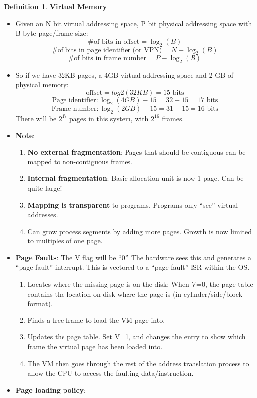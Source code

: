 \documentclass[11pt,a4paper]{article}
\theoremstyle{definition}
\newtheorem{definition}{Definition}[section]
\newenvironment{myitemize}
{ \begin{itemize}
    \setlength{\itemsep}{5pt}
    \setlength{\parskip}{0pt}
    \setlength{\parsep}{0pt}     }
{ \end{itemize}                  }
\newenvironment{myenumerate}
{ \begin{enumerate}
    \setlength{\itemsep}{5pt}
    \setlength{\parskip}{0pt}
    \setlength{\parsep}{0pt}     }
{ \end{enumerate}                }
\begin{document}
\begin{definition}{\textbf{Virtual Memory}}
\begin{myitemize}
	\item Given an N bit virtual addressing space, P bit physical addressing space with B byte page/frame size:
	\[\text{\# of bits in offset} = \log_2(B) \]
	\[\text{\# of bits in page identifier (or VPN)} = N - \log_2(B) \]
	\[\text{\# of bits in frame number} = P - \log_2(B) \]
	\item So if we have 32KB pages, a 4GB virtual addressing space and  2 GB of physical memory:
	\[\text{offset} =log2(32KB) = 15 \text{ bits}\]
	\[\text{Page identifier}: \log_2(4GB)-15=32-15=17 \text{ bits} \]
	\[\text{Frame number}: \log_2(2GB)-15=31-15=16 \text{ bits} \]
	There will be $2^{17}$ pages in this system, with $2^{16}$ frames.
	\item \textbf{Note}: 
	\begin{myenumerate}
		\item \textbf{No external fragmentation}: Pages that should be contiguous can be mapped to non-contiguous frames.
		\item \textbf{Internal fragmentation}: Basic allocation unit is now 1 page. Can be quite large!
		\item \textbf{Mapping is transparent} to programs. Programs only ``see'' virtual addresses.
		\item Can grow process segments by adding more pages. Growth is now limited to multiples of one page.
	\end{myenumerate}
	\item \textbf{Page Faults}: The V flag will be ``0''. The hardware sees this and generates a ``page fault'' interrupt. This is vectored to a “page fault” ISR within the OS.
	\begin{myenumerate}
		\item Locates where the missing page is on the disk: When V=0, the page table contains the location on disk where the page is (in cylinder/side/block format).
		\item Finds a free frame to load the VM page into.
		\item Updates the page table. Set V=1, and changes the entry to show which frame the virtual page has been loaded into.
		\item The VM then goes through the rest of the address translation process to allow the CPU to access the faulting data/instruction.
	\end{myenumerate}
	\item \textbf{Page loading policy}:
	\begin{myitemize}

\end{myitemize}
\end{myitemize}
\end{definition}
\end{document}
